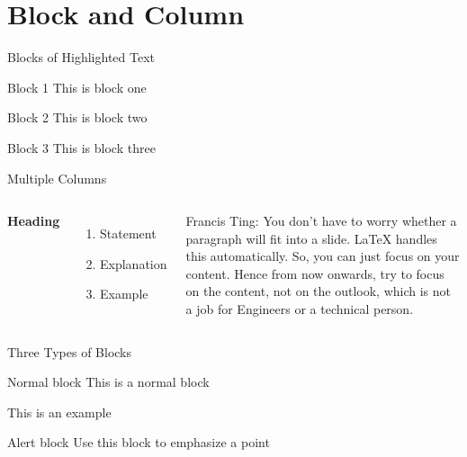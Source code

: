 \documentclass{beamer}
\begin{document}
\section{Block and Column}

\begin{frame}{Blocks of Highlighted Text}
\begin{block}{Block 1}
This is block one
\end{block}

\begin{block}{Block 2}
This is block two
\end{block}

\begin{block}{Block 3}
This is block three
\end{block}
\end{frame}

\begin{frame}{Multiple Columns}
\begin{columns}[c] %

\textbf{Heading}
\begin{enumerate}
\item Statement
\item Explanation
\item Example
\end{enumerate}

Francis Ting: You don't have to worry whether a paragraph will fit into a slide.  LaTeX handles this automatically.  So, you can just focus on your content.  Hence from now onwards, try to focus on the content, not on the outlook, which is not a job for Engineers or a technical person.

\end{columns}
\end{frame}

\begin{frame}{Three Types of Blocks}
	\begin{block}{Normal block}
This is a normal block	
\end{block}


\begin{Example}
	This is an example
\end{Example}

\begin{alertblock}{Alert block}
Use this block to emphasize a point	
\end{alertblock}

\end{frame}
\end{document}
